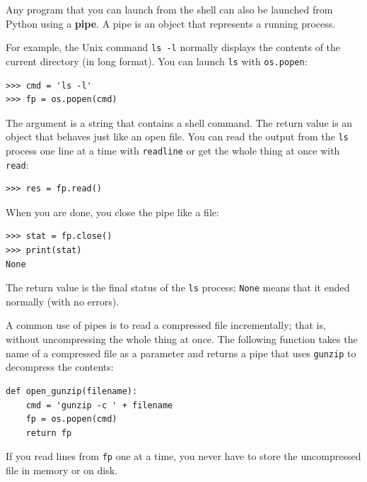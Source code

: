 \documentclass[10pt]{book}
\begin{document}

Any program that you can launch from the shell can also be
launched from Python using a {\bf pipe}.  A pipe is an object
that represents a running process.

For example, the Unix command {\tt ls -l} normally displays the
contents of the current directory (in long format).  You can
launch {\tt ls} with {\tt os.popen}:


\beforeverb
\begin{verbatim}
>>> cmd = 'ls -l'
>>> fp = os.popen(cmd)
\end{verbatim}
\afterverb
%
The argument is a string that contains a shell command.  The
return value is an object that behaves just like an open
file.  You can read the output from the {\tt ls} process one
line at a time with {\tt readline} or get the whole thing at
once with {\tt read}:


\beforeverb
\begin{verbatim}
>>> res = fp.read()
\end{verbatim}
\afterverb
%
When you are done, you close the pipe like a file:


\beforeverb
\begin{verbatim}
>>> stat = fp.close()
>>> print(stat)
None
\end{verbatim}
\afterverb
%
The return value is the final status of the {\tt ls} process;
{\tt None} means that it ended normally (with no errors).


A common use of pipes is to read a compressed file incrementally;
that is, without uncompressing the whole thing at once.  The
following function takes the name of a compressed file as a
parameter and returns a pipe that uses {\tt gunzip} to decompress
the contents:

\beforeverb
\begin{verbatim}
def open_gunzip(filename):
    cmd = 'gunzip -c ' + filename
    fp = os.popen(cmd)
    return fp
\end{verbatim}
\afterverb
%
If you read lines from {\tt fp} one at a time, you never have
to store the uncompressed file in memory or on disk.
\end{document}
